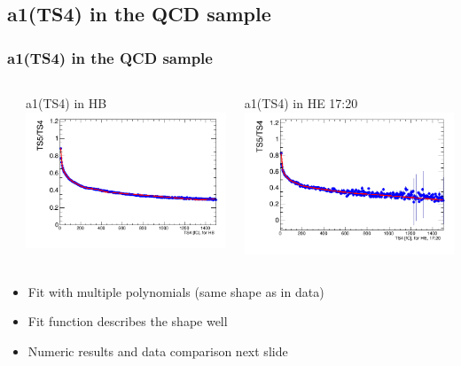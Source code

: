 \documentclass[bigger]{beamer}
\begin{document}
\subsection{a1(TS4) in the QCD sample}
\label{sec-3-4}
\begin{frame}
\frametitle{a1(TS4) in the QCD sample}
\label{sec-3-4-1}
\begin{columns} %
\label{sec-3-4-1-1}
\begin{column}{0.5\textwidth}
\label{sec-3-4-1-1-1}

\centering
a1(TS4) in HB
\includegraphics[width=\textwidth]{fig/a1_ring0.png}
\end{column}
\begin{column}{0.5\textwidth}
\label{sec-3-4-1-1-2}

\centering
a1(TS4) in HE 17:20
\includegraphics[width=\textwidth]{fig/a1_ring1.png}
\end{column}
\end{columns}
\label{sec-3-4-1-2}
\begin{itemize}

\item Fit with multiple polynomials (same shape as in data)
\label{sec-3-4-1-2-1}%

\item Fit function describes the shape well
\label{sec-3-4-1-2-2}%

\item Numeric results and data comparison next slide
\label{sec-3-4-1-2-3}%
\end{itemize} %
\end{frame}
\end{document}
